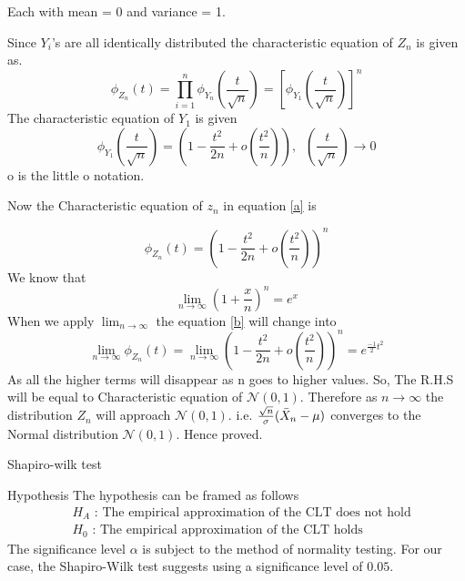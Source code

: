 \documentclass{beamer}
\begin{document}
\begin{frame}{}
    Each with mean = 0 and variance = 1.

Since $Y_i$'s are all identically distributed the characteristic equation of $Z_n$ is given as.
\begin{equation}
    \phi_{Z_n}(t) =\displaystyle \prod_{i=1}^n\phi_{Y_n}\left(\frac{t}{\sqrt{n}}\right) = \left[\phi_{Y_1}\left(\frac{t}{\sqrt{n}}\right)\right]^n
\end{equation}
The characteristic equation of $Y_1$ is given
\begin{equation}
    \phi_{Y_1}\left(\frac{t}{\sqrt{n}}\right) = \left(1-\frac{t^2}{2n} + o\left(\frac{t^2}{n}\right)\right), \;\; \left(\frac{t}{\sqrt{n}}\right)\to 0 \label{b}
\end{equation}
o is the little o notation.

Now the Characteristic equation of $z_n$ in equation \eqref{a} is 
\end{frame}

\begin{frame}{}
    \begin{equation}
    \phi_{Z_n}(t) = \left( 1-\frac{t^2}{2n} + o\left(\frac{t^2}{n}\right) \right)^n
\end{equation}
We know that 
$$\lim_{n\to\infty} \left(1+\frac{x}{n}\right)^n = e^x$$
When we apply $\lim_{n\to\infty}$ the equation \eqref{b} will change into 
\begin{equation}
    \lim_{n\to\infty}\phi_{Z_n}(t) =\lim_{n\to\infty}\left( 1-\frac{t^2}{2n} + o\left(\frac{t^2}{n}\right) \right)^n =  e^{\frac{-1}{2}t^2}
\end{equation}
As all the higher terms will disappear as n goes to higher values.
So, The R.H.S will be equal to Characteristic equation of $\mathcal{N}(0,1)$.
Therefore as $n\to\infty$ the distribution $Z_n$ will approach $\mathcal{N}(0,1)$.
i.e. $\frac{\sqrt{n}}{\sigma}(\Bar{X}_n - \mu) $ converges to the Normal distribution $\mathcal{N}(0,1)$.
Hence proved.
\end{frame}

\begin{frame}{Shapiro-wilk test}
    
\end{frame}

\begin{frame}{Hypothesis}
    The hypothesis can be framed as follows
\begin{align}
    & H_A\text{ : The empirical approximation of the CLT does not hold} \nonumber\\
    & H_0\text{ : The empirical approximation of the CLT holds}\nonumber
\end{align}
The significance level $\alpha$ is subject to the method of normality testing. For our case, the Shapiro-Wilk test suggests using a significance level of $0.05$. 
\end{frame}
\end{document}
